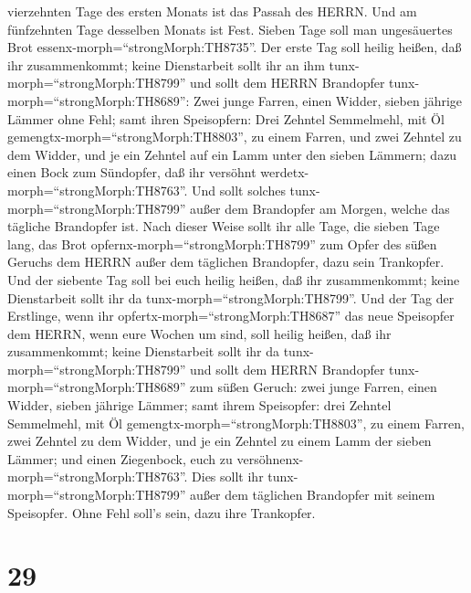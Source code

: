 vierzehnten Tage des ersten Monats ist das Passah des HERRN.
 Und am fünfzehnten Tage desselben Monats ist Fest. Sieben
Tage soll man ungesäuertes Brot essenx-morph=``strongMorph:TH8735''.
 Der erste Tag soll heilig heißen, daß ihr zusammenkommt;
keine Dienstarbeit sollt ihr an ihm tunx-morph=``strongMorph:TH8799''
 und sollt dem HERRN Brandopfer
tunx-morph=``strongMorph:TH8689'': Zwei junge Farren, einen Widder,
sieben jährige Lämmer ohne Fehl;  samt ihren Speisopfern:
Drei Zehntel Semmelmehl, mit Öl gemengtx-morph=``strongMorph:TH8803'',
zu einem Farren, und zwei Zehntel zu dem Widder,  und je
ein Zehntel auf ein Lamm unter den sieben Lämmern;  dazu
einen Bock zum Sündopfer, daß ihr versöhnt
werdetx-morph=``strongMorph:TH8763''.  Und sollt solches
tunx-morph=``strongMorph:TH8799'' außer dem Brandopfer am Morgen, welche
das tägliche Brandopfer ist.  Nach dieser Weise sollt ihr
alle Tage, die sieben Tage lang, das Brot
opfernx-morph=``strongMorph:TH8799'' zum Opfer des süßen Geruchs dem
HERRN außer dem täglichen Brandopfer, dazu sein Trankopfer.
 Und der siebente Tag soll bei euch heilig heißen, daß ihr
zusammenkommt; keine Dienstarbeit sollt ihr da
tunx-morph=``strongMorph:TH8799''.  Und der Tag der
Erstlinge, wenn ihr opfertx-morph=``strongMorph:TH8687'' das neue
Speisopfer dem HERRN, wenn eure Wochen um sind, soll heilig heißen, daß
ihr zusammenkommt; keine Dienstarbeit sollt ihr da
tunx-morph=``strongMorph:TH8799''  und sollt dem HERRN
Brandopfer tunx-morph=``strongMorph:TH8689'' zum süßen Geruch: zwei
junge Farren, einen Widder, sieben jährige Lämmer;  samt
ihrem Speisopfer: drei Zehntel Semmelmehl, mit Öl
gemengtx-morph=``strongMorph:TH8803'', zu einem Farren, zwei Zehntel zu
dem Widder,  und je ein Zehntel zu einem Lamm der sieben
Lämmer;  und einen Ziegenbock, euch zu
versöhnenx-morph=``strongMorph:TH8763''.  Dies sollt ihr
tunx-morph=``strongMorph:TH8799'' außer dem täglichen Brandopfer mit
seinem Speisopfer. Ohne Fehl soll's sein, dazu ihre Trankopfer.

\hypertarget{section-28}{%
\section{29}\label{section-28}}

